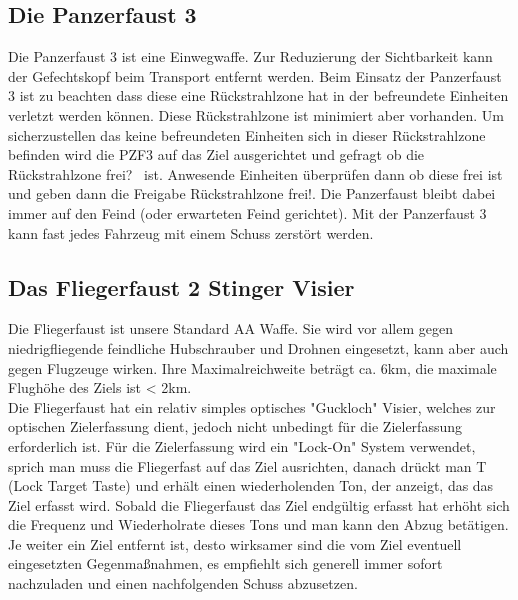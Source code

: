 \subsection{Die Panzerfaust 3}
	Die Panzerfaust 3 ist eine Einwegwaffe. Zur Reduzierung der Sichtbarkeit kann der Gefechtskopf beim Transport entfernt werden. Beim Einsatz der Panzerfaust 3 ist zu beachten dass diese eine Rückstrahlzone hat in der befreundete Einheiten verletzt werden können. Diese Rückstrahlzone ist minimiert aber vorhanden. Um sicherzustellen das keine befreundeten Einheiten sich in dieser Rückstrahlzone befinden wird die PZF3 auf das Ziel ausgerichtet und gefragt ob die 
\glqq Rückstrahlzone frei?\grqq ~ ist. Anwesende Einheiten überprüfen dann ob diese frei ist und geben dann die Freigabe \glqq Rückstrahlzone frei!\grqq. Die Panzerfaust bleibt dabei immer auf den Feind (oder erwarteten Feind gerichtet).  Mit der Panzerfaust 3 kann fast jedes Fahrzeug mit einem Schuss zerstört werden. \\

\subsection{Das Fliegerfaust 2 Stinger Visier}
	Die Fliegerfaust ist unsere Standard \acf{AA} Waffe. Sie wird vor allem gegen niedrigfliegende feindliche Hubschrauber und Drohnen eingesetzt, kann aber auch gegen Flugzeuge wirken. Ihre Maximalreichweite beträgt ca. 6km, die maximale Flughöhe des Ziels ist < 2km. \\
	Die Fliegerfaust hat ein relativ simples optisches "Guckloch" Visier, welches zur optischen Zielerfassung dient, jedoch nicht unbedingt für die Zielerfassung erforderlich ist. Für die Zielerfassung wird ein "Lock-On" System verwendet, sprich man muss die Fliegerfast auf das Ziel ausrichten, danach drückt man T (Lock Target Taste) und erhält einen wiederholenden Ton, der anzeigt, das das Ziel erfasst wird. Sobald die Fliegerfaust das Ziel endgültig erfasst hat erhöht sich die Frequenz und Wiederholrate dieses Tons und man kann den Abzug betätigen. Je weiter ein Ziel entfernt ist, desto wirksamer sind die vom Ziel eventuell eingesetzten 		 Gegenmaßnahmen, es empfiehlt sich generell immer sofort nachzuladen und einen nachfolgenden Schuss abzusetzen. \\

